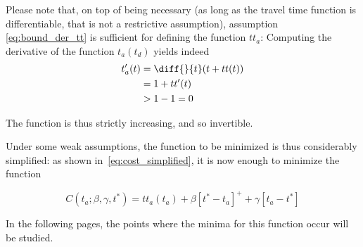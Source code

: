 Please note that, on top of being necessary (as long as the travel time function is differentiable, that is not a restrictive assumption),
assumption \eqref{eq:bound_der_tt} is sufficient for defining the function \(tt_a\):
Computing the derivative of the function \(t_a(t_d)\) yields indeed
\begin{align*}
  t_a'(t) & = \diff{}{t}(t + tt(t)) \\
          & = 1 + tt'(t) \\
          & > 1 - 1 = 0
\end{align*}

The function is thus strictly increasing, and so invertible.

Under some weak assumptions, the function to be minimized is thus considerably simplified:
as shown in~\eqref{eq:cost_simplified}, it is now enough to minimize the function

\begin{equation}
  \label{eq:cost_simplified_final}
  C(t_a; \beta, \gamma, t^*) = tt_a(t_a) + \beta [t^* - t_a]^+ + \gamma [t_a - t^*]
\end{equation}

In the following pages,
the points where the minima for this function occur will be studied.

